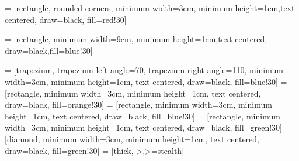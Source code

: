 \usepackage[a4paper, top=25.4mm, bottom=20.5mm, right=20.5mm, left=40mm]{geometry}


\usepackage{subfiles}           %

\usepackage[final]{graphicx}    %

\usepackage[numbers,sort]{natbib}
\usepackage{parskip}
\usepackage{subcaption}
\usepackage{setspace}
\usepackage{longtable}
\usepackage{multirow}
\usepackage{mathtools}
\usepackage[normalem]{ulem}
\usepackage{soul}
\usepackage[dvipsnames]{xcolor}
\usepackage{tikz}
\usetikzlibrary{arrows}
\usetikzlibrary{decorations.markings}
\usetikzlibrary{calc}
\usetikzlibrary{shapes, positioning}
\usetikzlibrary{shapes.geometric}
\usetikzlibrary{patterns,snakes}
\usetikzlibrary{decorations.text}
\usetikzlibrary{arrows.meta}
\usepackage{tikz}
\usetikzlibrary{mindmap}
\usetikzlibrary{shapes.geometric,arrows}
 = [rectangle, rounded corners, minimum width=3cm, minimum height=1cm,text centered, draw=black, fill=red!30]

 = [rectangle, minimum width=9cm, minimum height=1cm,text centered, draw=black,fill=blue!30]

 = [trapezium, trapezium left angle=70, trapezium right angle=110, minimum width=3cm, minimum height=1cm, text centered, draw=black, fill=blue!30]
 = [rectangle, minimum width=3cm, minimum height=1cm, text centered, draw=black, fill=orange!30]
 = [rectangle, minimum width=3cm, minimum height=1cm, text centered, draw=black, fill=blue!30]
 = [rectangle, minimum width=3cm, minimum height=1cm, text centered, draw=black, fill=green!30]
 = [diamond, minimum width=3cm, minimum height=1cm, text centered, draw=black, fill=green!30]
 = [thick,->,>=stealth]
\usepackage{pdflscape}
\usepackage{standalone}
\usepackage{float}
\usepackage{caption}
\usepackage{subcaption}
\usepackage{amsmath}
\usepackage{amsfonts}
\usepackage{amsthm}
\usepackage[ruled]{algorithm2e}
\usepackage{rotating,tabularx}
\usepackage{adjustbox}
\usepackage{enumerate}

